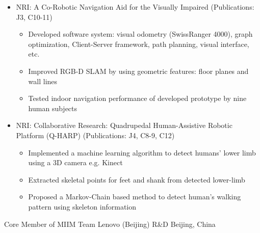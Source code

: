\begin{cventries}
{\begin{justify}
\begin{itemize}[leftmargin=2ex, nosep, noitemsep]
 		\renewcommand{\labelitemi}{\bullet}
 		\item {NRI: A Co-Robotic Navigation Aid for the Visually Impaired (Publications: J3, C10-11)}
 		\begin{itemize}[leftmargin=3ex]
 			\scriptsize
 			\item {Developed software system: visual odometry (SwissRanger 4000), graph optimization, Client-Server framework, path planning, visual interface, etc.}
 			\item {Improved RGB-D SLAM by using geometric features: floor planes and wall lines}
 			\item {Tested indoor navigation performance of developed prototype by nine human subjects}
 		\end{itemize}
 		\item {NRI: Collaborative Research: Quadrupedal Human-Assistive Robotic Platform (Q-HARP) (Publications: J4, C8-9, C12)}
 		\begin{itemize}[leftmargin=3ex]
 			\scriptsize
 			\item {Implemented a machine learning algorithm to detect humans' lower limb using a 3D camera e.g. Kinect}
 			\item {Extracted skeletal points for feet and shank from detected lower-limb}
 			\item {Proposed a Markov-Chain based method to detect human’s walking pattern using skeleton information}
 		\end{itemize}
 	\end{itemize}
 \end{justify}
 \vspace{-2.0mm}  
    }
	   \cventry
		{Core Member of MIIM Team} %
		{Lenovo (Beijing) R\&D} %
		{Beijing, China} %

\end{cventries}

